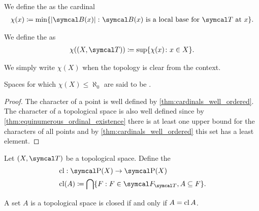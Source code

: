 \begin{definition}\label{def:topological_space_character}
  We define the  as the cardinal
  \begin{align*}
    \chi(x) \coloneqq \min \{ \Abs{\Cal{B(x)}} \colon \Cal{B(x)} \text{ is a local base for } \Cal{T} \text{ at } x \}.
  \end{align*}

  We define the  as
  \begin{align*}
    \chi((X, \Cal{T})) \coloneqq \sup \{ \chi(x) \colon x \in X \}.
  \end{align*}

  We simply write $\chi(X)$ when the topology is clear from the context.

  Spaces for which $\chi(X) \leq \aleph_0$ are said to be .
\end{definition}
\begin{proof}
  The character of a point is well defined by \cref{thm:cardinals_well_ordered}. The character of a topological space is also well defined since by \cref{thm:equinumerous_ordinal_existence} there is at least one upper bound for the characters of all points and by \cref{thm:cardinals_well_ordered} this set has a least element.
\end{proof}

\begin{definition}\label{def:closure_operator}\cite[33]{Engelking1989}
  Let $(X, \Cal{T})$ be a topological space. Define the 
  \begin{align*}
    &\Cl: \Power(X) \to \Power(X) \\
    &\Cl(A) \coloneqq \bigcap \{ F : F \in \Cal{F}_{\Cal{T}}, A \subseteq F \}.
  \end{align*}
\end{definition}

\begin{proposition}\label{thm:set_closed_iff_matches_closure}
  A set $A$ is a topological space is closed if and only if $A = \operatorname{cl} A$.
\end{proposition}

